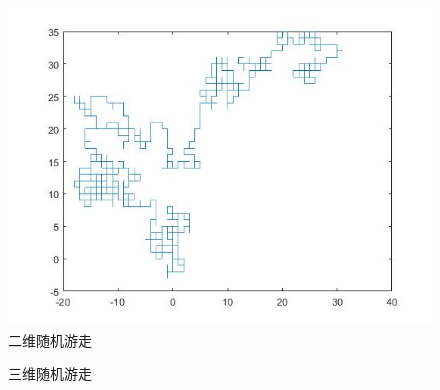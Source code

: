 \documentclass[UTF8]{ctexart}
\begin{document}
		\begin{figure}[H]
			\centering  %
			\includegraphics[width=6in]{../result_1/2d_xy}
			\caption{二维随机游走}
		\end{figure}
	
	\begin{figure}[H]
		\centering  %
		\caption{三维随机游走}
	\end{figure}
	
	

%	
	\newpage
\end{document}
